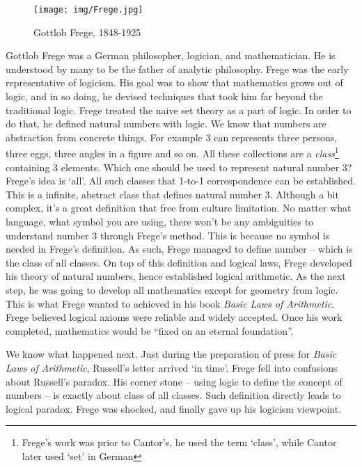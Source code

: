 \documentclass[b5paper]{article}
\begin{document}
\begin{wrapfigure}{L}{0.3\textwidth}
 \centering
 \texttt{[image: img/Frege.jpg]}
 \captionsetup{labelformat=empty}
 \caption{Gottlob Frege, 1848-1925}
 \label{fig:Frege}
\end{wrapfigure}


Gottlob Frege was a German philosopher, logician, and mathematician. He is understood by many to be the father of analytic philosophy. Frege was the early representative of logicism. His goal was to show that mathematics grows out of logic, and in so doing, he devised techniques that took him far beyond the traditional logic. Frege treated the naive set theory as a part of logic. In order to do that, he defined natural numbers with logic. We know that numbers are abstraction from concrete things. For example 3 can represents three persons, three eggs, three angles in a figure and so on. All these collections are a {\em class}\footnote{Frege's work was prior to Cantor's, he used the term `class', while Cantor later used `set' in German} containing 3 elements. Which one should be used to represent natural number 3? Frege's idea is `all'. All such classes that 1-to-1 correspondence can be established. This is a infinite, abstract class that defines natural number 3. Although a bit complex, it's a great definition that free from culture limitation. No matter what language, what symbol you are using, there won't be any ambiguities to understand number 3 through Frege's method. This is because no symbol is needed in Frege's definition. As such, Frege managed to define number -- which is the class of all classes. On top of this definition and logical laws, Frege developed his theory of natural numbers, hence established logical arithmetic. As the next step, he was going to develop all mathematics except for geometry from logic. This is what Frege wanted to achieved in his book {\em Basic Laws of Arithmetic}. Frege believed logical axioms were reliable and widely accepted. Once his work completed, mathematics would be ``fixed on an eternal foundation''.

We know what happened next. Just during the preparation of press for {\em Basic Laws of Arithmetic}, Russell's letter arrived `in time'. Frege fell into confusions about Russell's paradox. His corner stone -- using logic to define the concept of numbers -- is exactly about class of all classes. Such definition directly leads to logical paradox. Frege was shocked, and finally gave up his logicism viewpoint.
\end{document}
